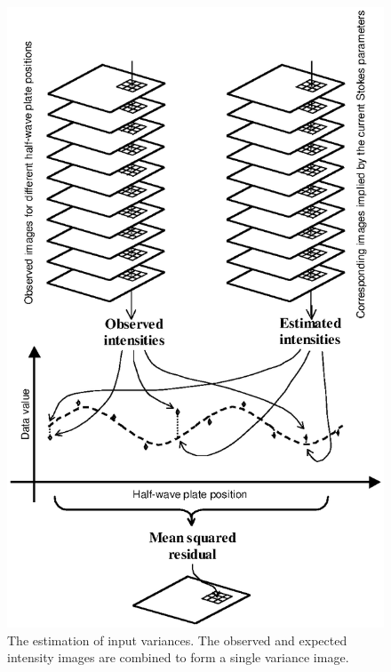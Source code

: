 \documentclass[twoside,11pt]{article}
\newenvironment{latexonly}{}{}
\renewcommand{\_}{\texttt{\symbol{95}}}
\begin{document}
\begin{latexonly}
  \vspace{2mm}
  \begin{figure}[htbp]
  \begin{center}
  \includegraphics[clip,scale=0.9]{sun223_figures/varest.eps}
  \caption{The estimation of input variances. The observed and expected
           intensity images are combined to form a single variance image.}
  \label{fig:varest}
  \end{center}
  \end{figure}
\end{latexonly}
\end{document}
